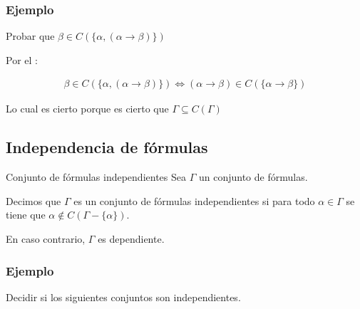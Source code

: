 \subsubsection{Ejemplo}

Probar que $\beta \in C( \{ \alpha, (\alpha\to\beta) \})$

Por el :

\begin{gather*}
    \beta \in C( \{ \alpha, (\alpha\to\beta) \}) \iff
    (\alpha\to\beta) \in C(\{ \alpha\to\beta \})
\end{gather*}

Lo cual es cierto porque es cierto que $\Gamma \subseteq C(\Gamma)$


\subsection{Independencia de fórmulas}

\begin{definicion}{Conjunto de fórmulas independientes}{}
    Sea $\Gamma$ un conjunto de fórmulas.

    \medskip

    Decimos que $\Gamma$ es un conjunto de fórmulas independientes si para
    todo $\alpha \in \Gamma$ se tiene que $\alpha \notin C(\Gamma-\{\alpha\})$.

    En caso contrario, $\Gamma$ es dependiente.
\end{definicion}

\subsubsection{Ejemplo}

Decidir si los siguientes conjuntos son independientes.

